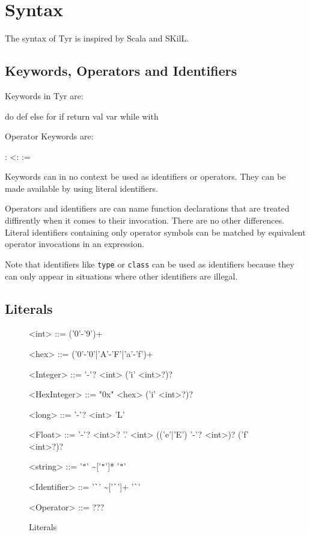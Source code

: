 \section{Syntax}

The syntax of Tyr is inspired by Scala and SKilL.

\subsection{Keywords, Operators and Identifiers}

Keywords in Tyr are:
\begin{center}
do
	\quad def
	\quad else
	\quad for
	\quad if
	\quad return
	\quad val
	\quad var
	\quad while
	\quad with
\end{center}
Operator Keywords are:
\begin{center}
 :
\quad <:
\quad :=	
\end{center}

Keywords can in no context be used as identifiers or operators.
They can be made available by using literal identifiers.

Operators and identifiers are can name function declarations that are treated diffirently when it comes to their invocation.
There are no other differences.
Literal identifiers containing only operator symbols can be matched by equivalent operator invocations in an expression.

Note that identifiers like \texttt{type} or \texttt{class} can be used as identifiers because they can only appear in situations where other identifiers are illegal.

\subsection{Literals}


\begin{figure}
	\begin{grammar}
		<int> ::= ('0'-'9')+
		
		<hex> ::= ('0'-'0'|'A'-'F'|'a'-'f')+
		
		<Integer> ::= '-'? <int> ('i' <int>?)?
		
		<HexInteger> ::= "0x" <hex> ('i' <int>?)?
		
		<long> ::= '-'? <int> 'L'
		
		<Float> ::= '-'? <int>? '.' <int> (('e'|'E') '-'? <int>)? ('f' <int>?)?
		
		<string> ::= '\verb|"|' \textasciitilde['\verb|"|']* '\verb|"|'
		
		<Identifier> ::= '\verb|`|' \textasciitilde['\verb|`|']+ '\verb|`|'
		
		<Operator> ::= ???
	\end{grammar}
	\caption{Literals}
	\label{fig:syn:literals}
\end{figure}

